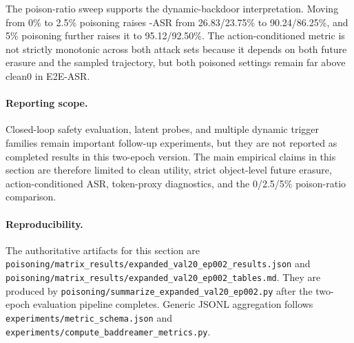 The poison-ratio sweep supports the dynamic-backdoor interpretation. Moving
from 0\% to 2.5\% poisoning raises \vavim-ASR from 26.83/23.75\% to
90.24/86.25\%, and 5\% poisoning further raises it to 95.12/92.50\%. The
action-conditioned metric is not strictly monotonic across both attack sets
because it depends on both future erasure and the sampled \vavam trajectory,
but both poisoned settings remain far above clean0 in E2E-ASR.

\paragraph{Reporting scope.}
Closed-loop safety evaluation, latent probes, and multiple dynamic trigger
families remain important follow-up experiments, but they are not reported as
completed results in this two-epoch version. The main empirical claims in this
section are therefore limited to clean utility, strict object-level future
erasure, action-conditioned ASR, token-proxy diagnostics, and the 0/2.5/5\%
poison-ratio comparison.

\paragraph{Reproducibility.}
The authoritative artifacts for this section are
\texttt{poisoning/matrix\_results/expanded\_val20\_ep002\_results.json} and
\texttt{poisoning/matrix\_results/expanded\_val20\_ep002\_tables.md}. They are
produced by \texttt{poisoning/summarize\_expanded\_val20\_ep002.py} after the
two-epoch evaluation pipeline completes. Generic JSONL aggregation follows
\texttt{experiments/metric\_schema.json} and
\texttt{experiments/compute\_baddreamer\_metrics.py}.
